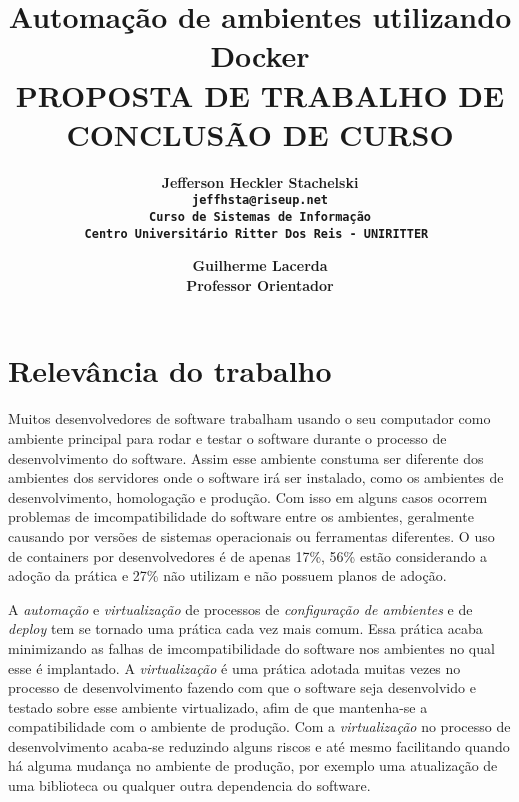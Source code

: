 \documentclass[11pt,a4paper]{article}
\begin{document}
\title{Automação de ambientes utilizando Docker\\ \smallskip
\small{PROPOSTA DE TRABALHO DE CONCLUSÃO DE CURSO}}

\author{ \bf Jefferson Heckler Stachelski\\
  \tt jeffhsta@riseup.net \\
  Curso de Sistemas de Informação \\
  Centro Universitário Ritter Dos Reis - UNIRITTER
  \and
  \bf Guilherme Lacerda\\
  Professor Orientador\\
}

\maketitle
\thispagestyle{empty}

\section{Relevância do trabalho} \label{sec:intro}

Muitos desenvolvedores de software trabalham usando o seu computador como ambiente principal para rodar e testar
o software durante o processo de desenvolvimento do software. Assim esse ambiente constuma ser diferente dos ambientes
dos servidores onde o software irá ser instalado, como os ambientes de desenvolvimento, homologação e produção.
Com isso em alguns casos ocorrem problemas de imcompatibilidade do software entre os ambientes, geralmente causando
por versões de sistemas operacionais ou ferramentas diferentes. O uso de containers por desenvolvedores é de apenas
17\%, 56\% estão considerando a adoção da prática e 27\% não utilizam e não possuem planos de adoção\cite{DZone_CD_guide_v3}.

A \textit{automação} e \textit{virtualização} de processos de \textit{configuração de ambientes} e de \textit{deploy} tem
se tornado uma prática cada vez mais comum\cite{DZone_CD_guide_v3}. Essa prática acaba minimizando as falhas de imcompatibilidade do software
nos ambientes no qual esse é implantado\cite{Fowler_continuos_integration}. A \textit{virtualização} é uma prática
adotada muitas vezes no processo de desenvolvimento fazendo com que o software seja desenvolvido e testado sobre
esse ambiente virtualizado, afim de que mantenha-se a compatibilidade com o ambiente de produção. Com a
\textit{virtualização} no processo de desenvolvimento acaba-se reduzindo alguns riscos e até mesmo facilitando
quando há alguma mudança no ambiente de produção, por exemplo uma atualização de uma biblioteca ou qualquer
outra dependencia do software\cite{Fowler_continuos_integration}.
\end{document}
